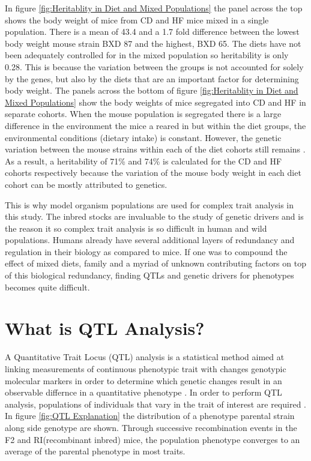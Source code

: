\documentclass[a4paper,11pt,twoside]{book}
\begin{document}
     In figure \ref{fig:Heritablity in Diet and Mixed Populations} the panel across the top shows the body weight of mice from CD and HF mice mixed in a single population. There is a mean of 43.4 and a 1.7 fold difference between the lowest body weight mouse strain BXD 87 and the highest, BXD 65. The diets have not been adequately controlled for in the mixed population so heritability is only 0.28.  This is because the variation between the groups is not accounted for solely by the genes, but also by the diets that are an important factor for determining body weight\citep{GerhardAdam2012}. The panels across the bottom of figure \ref{fig:Heritablity in Diet and Mixed Populations} show the body weights of mice segregated into CD and HF in separate cohorts. When the mouse population is segregated there is a large difference in the environment the mice a reared in but within the diet groups, the environmental conditions (dietary intake) is constant. However, the genetic variation between the mouse strains within each of the diet cohorts still remains \citep{GerhardAdam2012}. As a result, a heritability of 71\% and 74\% is calculated for the CD and HF cohorts respectively because the variation of the mouse body weight in each diet cohort can be mostly attributed to genetics. 
	
	This is why model organism populations are used for complex trait analysis in this study. The inbred stocks are invaluable to the study of genetic drivers and is the reason it so complex trait analysis is so difficult in human and wild populations. Humans already have several additional layers of redundancy and regulation in their biology as compared to mice\citep{Kafri2006Thecircuits}. If one was to compound the effect of mixed diets, family and a myriad of unknown contributing factors on top of this biological redundancy, finding QTLs and genetic drivers for phenotypes becomes quite difficult. 
	
	
	\section{What is QTL Analysis?}
	
	A Quantitative Trait Locus (QTL) analysis is a statistical method aimed at linking measurements of continuous phenotypic trait with changes genotypic molecular markers in order to determine which genetic changes result in an observable differnce in a quantitative phenotype \citep*{Yong2016}. In order to perform QTL analysis, populations of individuals that vary in the trait of interest are required \citep{Mackay2009TheProspects}. In figure \ref{fig:QTL Explanation} the distribution of a phenotype parental strain along side genotype are shown. Through successive recombination events in the F2 and RI(recombinant inbred) mice, the population phenotype converges to an average of the parental phenotype in most traits. 
	
\end{document}
